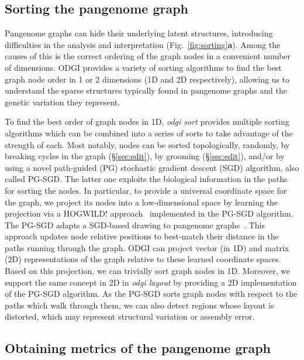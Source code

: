 \documentclass{bioinfo}
\begin{document}
\subsection{Sorting the pangenome graph}
\label{sec:sort}

Pangenome graphs can hide their underlying latent structures, introducing difficulties in the analysis and interpretation (Fig.~\ref{fig:sorting}\textbf{a}).
Among the causes of this is the correct ordering of the graph nodes in a convenient number of dimensions.
ODGI provides a variety of sorting algorithms to find the best graph node order in 1 or 2 dimensions (1D and 2D respectively), allowing us
to understand the sparse structures typically found in pangenome graphs and the genetic variation they represent.

To find the best order of graph nodes in 1D, \textit{odgi sort} provides multiple sorting algorithms which can be combined into a series of sorts to take advantage of the strength of each.
Most notably, nodes can be sorted topologically, randomly, by breaking cycles in the graph (\S\ref{sec:edit}), by grooming (\S\ref{sec:edit}), and/or by using a novel path-guided (PG) stochastic gradient descent (SGD) algorithm, also called PG-SGD.
The latter one exploits the biological information in the paths for sorting the nodes.
In particular, to provide a universal coordinate space for the graph, we project its nodes into a low-dimensional space
by learning the projection via a HOGWILD! approach~\citep{niu2011hogwild} implemented in the PG-SGD algorithm.
The PG-SGD adapts a SGD-based drawing to pangenome graphs~\citep{zheng2018graph}.
This approach updates node relative positions to best-match their distance in the paths running through the graph.
ODGI can project vector (in 1D) and matrix (2D) representations of the graph relative to these learned coordinate spaces.
Based on this projection, we can trivially sort graph nodes in 1D. Moreover, we support the same concept in 2D in \textit{odgi layout}
by providing a 2D implementation of the PG-SGD algorithm.
As the PG-SGD sorts graph nodes with respect to the paths which walk through them, we can also detect regions whose layout is distorted, which may represent structural variation or assembly error.


\subsection{Obtaining metrics of the pangenome graph}
\label{sec:metrics}
\end{document}
